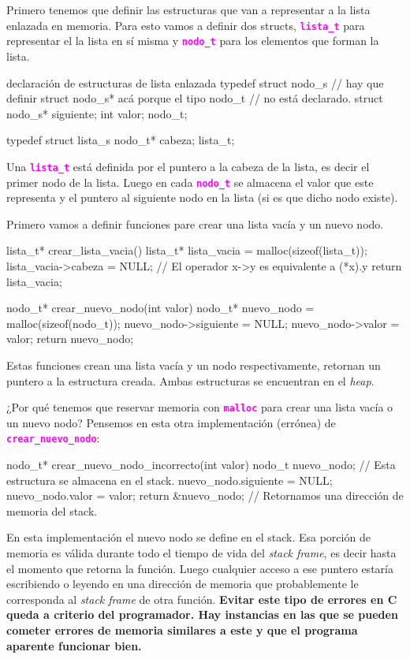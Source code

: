 \documentclass[]{scrartcl}
\newcommand{\hl}[1]{\textcolor{magenta}{\textbf{\texttt{#1}}}}
\begin{document}
Primero tenemos que definir las estructuras que van a representar a la lista enlazada en memoria. Para esto vamos a definir dos structs, \hl{lista\_t} para representar el la lista en sí misma y \hl{nodo\_t} para los elementos que forman la lista.

\begin{cbox}[unbreakable]{declaración de estructuras de lista enlazada}
typedef struct nodo_s {
    // hay que definir struct nodo_s* acá porque el tipo nodo_t 
    // no está declarado.
    struct nodo_s* siguiente;
    int valor;
} nodo_t;

typedef struct lista_s {
    nodo_t* cabeza;
} lista_t;
\end{cbox}

Una \hl{lista\_t} está definida por el puntero a la cabeza de la lista, es decir el primer nodo de la lista. Luego en cada \hl{nodo\_t} se almacena el valor que este representa y el puntero al siguiente nodo en la lista (si es que dicho nodo existe).

Primero vamos a definir funciones pare crear una lista vacía y un nuevo nodo.

\begin{cbox}[unbreakable]{}
lista_t* crear_lista_vacia() {
    lista_t* lista_vacia = malloc(sizeof(lista_t));
    lista_vacia->cabeza = NULL; // El operador x->y es equivalente a (*x).y
    return lista_vacia;
}

nodo_t* crear_nuevo_nodo(int valor) {
    nodo_t* nuevo_nodo = malloc(sizeof(nodo_t));
    nuevo_nodo->siguiente = NULL;
    nuevo_nodo->valor = valor;
    return nuevo_nodo;
}
\end{cbox}

Estas funciones crean una lista vacía y un nodo respectivamente, retornan un puntero a la estructura creada. Ambas estructuras se encuentran en el \textit{heap}.

¿Por qué tenemos que reservar memoria con \hl{malloc} para crear una lista vacía o un nuevo nodo? Pensemos en esta otra implementación (errónea) de \hl{crear\_nuevo\_nodo}:

\begin{cbox}[unbreakable]{}
nodo_t* crear_nuevo_nodo_incorrecto(int valor) {
    nodo_t nuevo_nodo; // Esta estructura se almacena en el stack.
    nuevo_nodo.siguiente = NULL;
    nuevo_nodo.valor = valor;
    return &nuevo_nodo; // Retornamos una dirección de memoria del stack.
}
\end{cbox}

En esta implementación el nuevo nodo se define en el stack. Esa porción de memoria es válida durante todo el tiempo de vida del \textit{stack frame}, es decir hasta el momento que retorna la función. Luego cualquier acceso a ese puntero estaría escribiendo o leyendo en una dirección de memoria que probablemente le corresponda al \textit{stack frame} de otra función. \textbf{Evitar este tipo de errores en C queda a criterio del programador. Hay instancias en las que se pueden cometer errores de memoria similares a este y que el programa aparente funcionar bien.}
\end{document}
